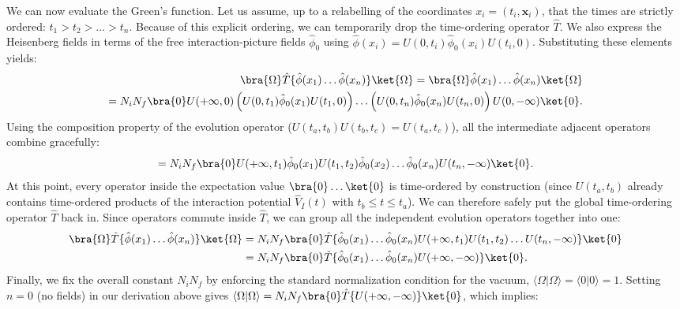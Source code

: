 We can now evaluate the Green's function. Let us assume, up to a relabelling of the coordinates \(x_i = (t_i, \mathbf{x}_i)\), that the times are strictly ordered: \(t_1 > t_2 > \dots > t_n\). Because of this explicit ordering, we can temporarily drop the time-ordering operator \(\hat{T}\). We also express the Heisenberg fields in terms of the free interaction-picture fields \(\hat{\phi}_0\) using \(\hat{\phi}(x_i) = U(0, t_i) \hat{\phi}_0(x_i) U(t_i, 0)\). Substituting these elements yields:
\[
    \begin{aligned}
        \bra{\Omega} \hat{T} \{ \hat{\phi}(x_1) \dots \hat{\phi}(x_n) \} \ket{\Omega}
        = \bra{\Omega} \hat{\phi}(x_1) \dots \hat{\phi}(x_n) \ket{\Omega} \\
        = N_i N_f \bra{0} U(+\infty, 0) \left( U(0, t_1) \hat{\phi}_0(x_1) U(t_1, 0) \right) \dots \left( U(0, t_n) \hat{\phi}_0(x_n) U(t_n, 0) \right) U(0, -\infty) \ket{0}.
    \end{aligned}
\]
Using the composition property of the evolution operator (\(U(t_a, t_b) U(t_b, t_c) = U(t_a, t_c)\)), all the intermediate adjacent operators combine gracefully:
\[
    = N_i N_f \bra{0} U(+\infty, t_1) \hat{\phi}_0(x_1) U(t_1, t_2) \hat{\phi}_0(x_2) \dots \hat{\phi}_0(x_n) U(t_n, -\infty) \ket{0}.
\]
At this point, every operator inside the expectation value \(\bra{0} \dots \ket{0}\) is time-ordered by construction (since \(U(t_a, t_b)\) already contains time-ordered products of the interaction potential \(\hat{V}_I(t)\) with \(t_b \leq t \leq t_a\)). We can therefore safely put the global time-ordering operator \(\hat{T}\) back in. Since operators commute inside \(\hat{T}\), we can group all the independent evolution operators together into one:
\[
    \begin{aligned}
        \bra{\Omega} \hat{T} \{ \hat{\phi}(x_1) \dots \hat{\phi}(x_n) \} \ket{\Omega}
         & = N_i N_f \bra{0} \hat{T} \{ \hat{\phi}_0(x_1) \dots \hat{\phi}_0(x_n) U(+\infty, t_1) U(t_1, t_2) \dots U(t_n, -\infty) \} \ket{0} \\
         & = N_i N_f \bra{0} \hat{T} \{ \hat{\phi}_0(x_1) \dots \hat{\phi}_0(x_n) U(+\infty, -\infty) \} \ket{0}.
    \end{aligned}
\]
Finally, we fix the overall constant \(N_i N_f\) by enforcing the standard normalization condition for the vacuum, \(\langle\Omega|\Omega\rangle = \langle 0|0 \rangle = 1\). Setting \(n=0\) (no fields) in our derivation above gives \(\langle \Omega | \Omega \rangle = N_i N_f \bra{0} \hat{T} \{ U(+\infty, -\infty) \} \ket{0}\), which implies:
